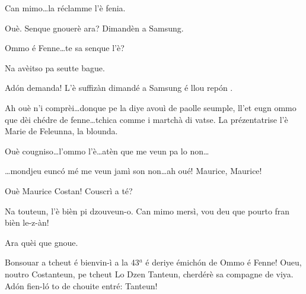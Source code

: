 \begin{drama}
\Vioujspeaks{} Can mimo\ldots la réclamme l'è fenia.

\Vioupspeaks Ouè. Senque gnouerè ara? Dimandèn a Samsung.


\Vioupspeaks \og Ommo é Fenne\fg\ldots te sa senque l'è?

\Vioujspeaks{} Na avèitso pa seutte bague.

\Vioupspeaks Ad\'on demanda! L'è suffizàn dimandé a Samsung é llou rep\'on .


\Vioupspeaks Ah ouè n'i comprèi\ldots donque pe la diye avouì de paolle seumple, ll'et eugn ommo que dèi chédre de fenne\ldots tchica comme i martchà di vatse. La prézentatrise l'è Marie de Feleunna, la blounda.

\Vioujspeaks Ouè cougniso\ldots l'ommo l'è\ldots atèn que me veun pa lo non\ldots

\Vioupspeaks \ldots mondjeu eunc\'o mé me veun jamì son non\ldots ah oué! Maurice, Maurice!

\Vioujspeaks Ouè Maurice Costan! Couscrì a té?

\Vioupspeaks Na touteun, l'è bièn pi dzouveun-o. Can mimo mersì, vou deu que pourto fran bièn le-z-àn!

\Vioujspeaks Ara quèi que gnoue.








\Mariespeaks Bonsouar a tcheut é bienvin-ì a la 43$^a$ é deriye émich\'on de \og Ommo é Fenne\fg! Oueu, noutro Costanteun, pe tcheut \og Lo Dzen Tanteun\fg, cherdérè sa compagne de viya. Ad\'on fien-l\'o to de chouite entré: Tanteun!


\end{drama}
